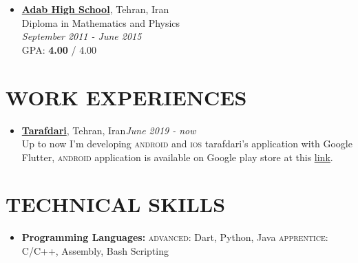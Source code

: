 \documentclass[margin]{res}
\begin{document}
\begin{resume}
\begin{itemize}
\item \textbf{\href{http://adab.sch.ir/HSchool}{Adab High School}}, Tehran, Iran\\
Diploma in Mathematics and Physics \\ \textit{September 2011 - June 2015}\\
GPA: \textbf{4.00} / 4.00

\end{itemize}



\section{WORK EXPERIENCES}
	
\begin{itemize} \itemsep -5pt

\item \textbf{\href{https://tarafdari.com}{Tarafdari}}, Tehran, Iran\hfill \textsl{June 2019 - now}\\
Up to now I'm developing \textsc{android} and \textsc{ios} tarafdari's application with Google Flutter,
\textsc{android} application is available on Google play store at this
\href{https://play.google.com/store/apps/details?id=com.tarafdari.news}{\underline{link}}.


\end{itemize}



\section{TECHNICAL SKILLS}
	
\begin{itemize} \itemsep -8pt

\item \textbf{Programming Languages:}
\subitem \textsc{advanced:}
Dart, Python, Java
\subitem \textsc{apprentice:}
C/C++, Assembly, Bash Scripting\\


\end{itemize}
\end{resume}
\end{document}
